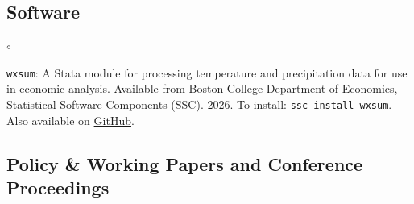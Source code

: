 \documentclass[letterpaper]{article}
\begin{document}
\renewenvironment{itemize}{
  \begin{list}{$\circ$}{
    \setlength{\leftmargin}{1.5em}
  }
}{
  \end{list}
}


\subsection*{Software}

\begin{itemize}
    \item \verb|wxsum|: A Stata module for processing temperature and precipitation data for use in economic analysis. Available from Boston College Department of Economics, Statistical Software Components (SSC). 2026. To install: \verb|ssc install wxsum|. Also available on \href{https://github.com/jdavidm/wxsum}{GitHub}.
\end{itemize}

\subsection*{Policy \& Working Papers and Conference Proceedings}
\end{document}
